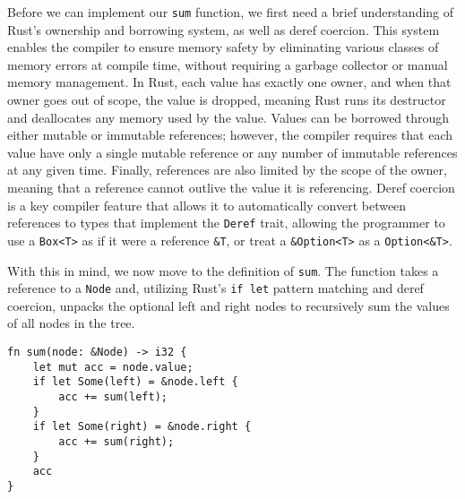 \documentclass[12pt, letterpaper]{article}
\begin{document}
Before we can implement our \texttt{sum} function, we first need a brief understanding of Rust's ownership and borrowing system, as well as deref coercion. This system enables the compiler to ensure memory safety by eliminating various classes of memory errors at compile time, without requiring a garbage collector or manual memory management. In Rust, each value has exactly one owner, and when that owner goes out of scope, the value is dropped, meaning Rust runs its destructor and deallocates any memory used by the value. Values can be borrowed through either mutable or immutable references; however, the compiler requires that each value have only a single mutable reference or any number of immutable references at any given time. Finally, references are also limited by the scope of the owner, meaning that a reference cannot outlive the value it is referencing.\autocite[\href{https://doc.rust-lang.org/book/ch04-00-understanding-ownership.html}{chap.~4}]{rust-book} Deref coercion is a key compiler feature that allows it to automatically convert between references to types that implement the \texttt{Deref} trait, allowing the programmer to use a \texttt{Box<T>} as if it were a reference \texttt{\&T}, or treat a \texttt{\&Option<T>} as a \texttt{Option<\&T>}.\autocite[\href{https://doc.rust-lang.org/book/ch15-02-deref.html}{chap.~15~\S~2}]{rust-book}

With this in mind, we now move to the definition of \texttt{sum}. The function takes a reference to a \texttt{Node} and, utilizing Rust's \texttt{if let} pattern matching and deref coercion, unpacks the optional left and right nodes to recursively sum the values of all nodes in the tree.
\begin{verbatim}
fn sum(node: &Node) -> i32 {
    let mut acc = node.value;
    if let Some(left) = &node.left {
        acc += sum(left);
    }
    if let Some(right) = &node.right {
        acc += sum(right);
    }
    acc
}
\end{verbatim}
\end{document}
